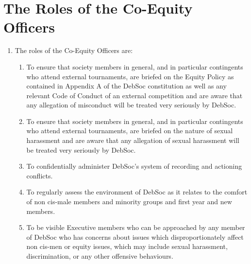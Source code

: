 \newpage
\section{The Roles of the Co-Equity Officers}

\begin{enumerate}
\item The roles of the Co-Equity Officers are:
  \begin{enumerate}
  \item To ensure that society members in general, and in particular contingents who attend external tournaments, are briefed on the Equity Policy as contained in Appendix A of the DebSoc constitution as well as any relevant Code of Conduct of an external competition and are aware that any allegation of misconduct will be treated very seriously by DebSoc.
  \item To ensure that society members in general, and in particular contingents who attend external tournaments, are briefed on the nature of sexual harassment and are aware that any allegation of sexual harassment will be treated very seriously by DebSoc.
  \item To confidentially administer DebSoc’s system of recording and actioning conflicts.
  \item To regularly assess the environment of DebSoc as it relates to the comfort of non cis-male members and minority groups and first year and new members.
  \item To be visible Executive members who can be approached by any member of DebSoc who has concerns about issues which disproportionately affect non cis-men or equity issues, which may include sexual harassment, discrimination, or any other offensive behaviours.
  \end{enumerate}
\end{enumerate}
